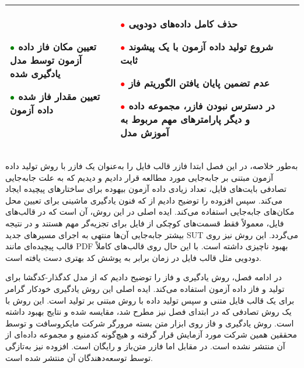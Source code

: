 \begin{table}
\begin{tabularx}{\textwidth}{p{}p{}p{}p{}}
		\textcolor{green}{$\bullet$}
		تعیین مکان فاز داده آزمون توسط مدل یادگیری شده
			
			\textcolor{green}{$\bullet$}
		تعیین مقدار فاز شده داده آزمون&
		
		\textcolor{red}{$\bullet$}
		حذف کامل داده‌های دودویی
		
		\textcolor{red}{$\bullet$}
		شروع تولید داده آزمون با یک پیشوند ثابت
		
			\textcolor{red}{$\bullet$}
			عدم تضمین پایان یافتن الگوریتم فاز
		
			\textcolor{red}{$\bullet$}
			در دسترس نبودن فازر، مجموعه داده و دیگر پارامترهای مهم مربوط به آموزش مدل
		\\
		\bottomrule[1.5pt]
		
	\end{tabularx} 
\end{table}


به‌طور خلاصه، در این فصل ابتدا فازر قالب فایل
  \cite{Zalewsky2013}
را به‌عنوان یک فازر با روش تولید داده آزمون مبتنی بر جابه‌جایی مورد مطالعه قرار دادیم و دیدیم که به علت جابه‌جایی تصادفی بایت‌های فایل، تعداد زیادی داده آزمون بیهوده برای ساختارهای پیچیده ایجاد می‌کند. سپس افزوده 
\cite{DBLP:journals/corr/abs-1711-04596}
را توضیح دادیم از که فنون یادگیری ماشینی برای تعیین محل مکان‌های جابه‌جایی استفاده می‌کند. ایده اصلی در این روش، آن است که در قالب‌های فایل، معمولاً فقط قسمت‌های کوچکی از فایل برای تجزیه‌گر مهم هستند و در نتیجه بیشتر جابه‌جایی آن‌ها منتهی‌ به اجرای مسیرهای جدید \gls{SUT} می‌گردد. این روش نیز روی قالب پیچیده‌ای مانند \gls{PDF} بهبود ناچیزی داشته است. با این حال روی قالب‌های کاملاً دودویی مثل قالب فایل  در زمان برابر به پوشش کد بهتری دست یافته است.

در ادامه فصل، روش یادگیری و فاز
 \cite{Godefroid:2017:LML:3155562.3155573}
  را توضیح دادیم که از مدل کدگذار-کدگشا برای تولید و فاز داده آزمون استفاده می‌کند. ایده اصلی این روش یادگیری خودکار گرامر برای یک قالب فایل متنی و سپس تولید داده با روش مبتنی بر تولید است. این روش با یک روش تصادفی که در ابتدای فصل نیز مطرح شد، مقایسه شده‌ و نتایج بهبود داشته است. روش یادگیری و فاز روی ابزار متن بسته مرورگر  شرکت مایکروسافت و توسط محققین همین شرکت مورد آزمایش قرار گرفته و هیچ‌گونه کدمنبع و مجموعه داده‌ای از آن منتشر نشده است. در مقابل اما فازر  متن‌باز و رایگان است. افزوده نیز به‌تازگی توسط توسعه‌دهندگان آن منتشر شده است. 

